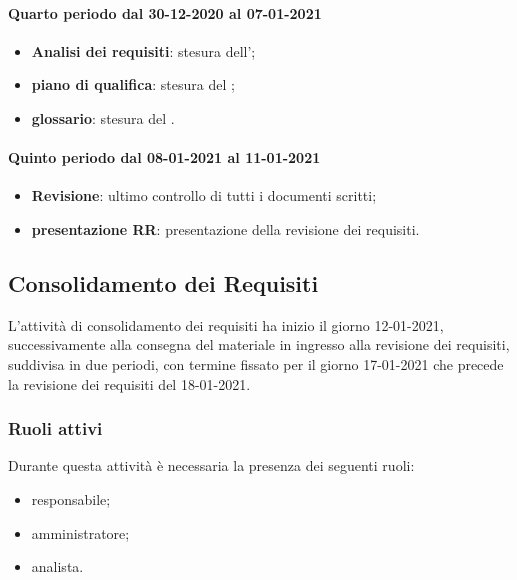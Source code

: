 \paragraph{Quarto periodo dal 30-12-2020 al 07-01-2021}
\begin{itemize}
	\item \textbf{Analisi dei requisiti}: stesura dell’;
	\item \textbf{piano di qualifica}: stesura del ;
	\item \textbf{glossario}: stesura del .
\end{itemize}

\paragraph{Quinto periodo dal 08-01-2021 al 11-01-2021}
\begin{itemize}
	\item \textbf{Revisione}: ultimo controllo di tutti i documenti scritti;
	\item \textbf{presentazione RR}: presentazione della revisione dei requisiti.
\end{itemize}


\newpage


\newpage

\subsection{Consolidamento dei Requisiti}
L'attività di consolidamento dei requisiti ha inizio il giorno 12-01-2021, successivamente alla consegna del materiale in ingresso alla revisione dei requisiti, suddivisa in due periodi, con termine fissato
per il giorno 17-01-2021 che precede la revisione dei requisiti del 18-01-2021.

\subsubsection{Ruoli attivi}
Durante questa attività è necessaria la presenza dei seguenti ruoli:
\begin{itemize}
	\item responsabile;
	\item amministratore;
	\item analista.
\end{itemize}

